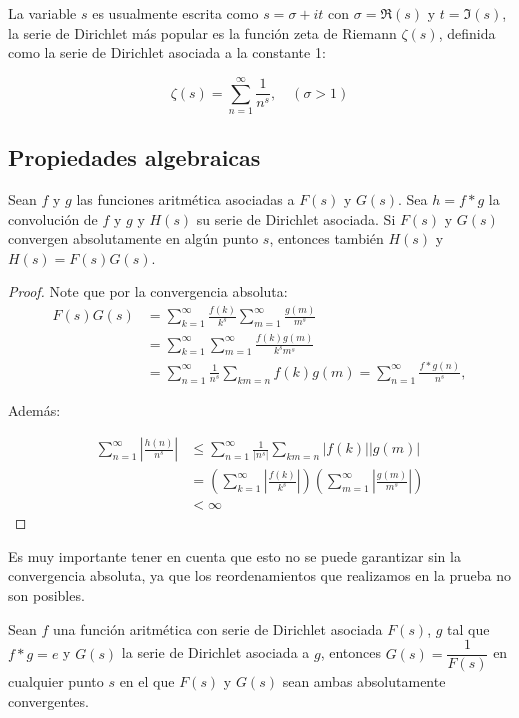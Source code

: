 La variable $s$ es usualmente escrita como $s=\sigma+it$ con $\sigma=\Re(s)$ y $t=\Im(s)$, la serie de Dirichlet más popular es la función zeta de Riemann $\zeta(s)$, definida como la serie de Dirichlet asociada a la constante 1:

$$\zeta(s)=\sum_{n=1}^{\infty} \frac{1}{n^s}, \quad (\sigma>1) $$

\subsection{Propiedades algebraicas}

\begin{theorem}\label{proddirich}
Sean $f$ y $g$ las funciones aritmética asociadas a $F(s)$ y $G(s)$. Sea $h=f*g$ la convolución de $f$ y $g$ y $H(s)$ su serie de Dirichlet asociada. Si $F(s)$ y $G(s)$ convergen absolutamente en algún punto $s$, entonces también $H(s)$ y $H(s)=F(s)G(s)$. 
\end{theorem}

\begin{proof}
Note que por la convergencia absoluta:
$$
\begin{aligned}
F(s) G(s) &=\sum_{k=1}^{\infty} \frac{f(k)}{k^s}\sum_{m=1}^{\infty} \frac{g(m)}{m^s} \\
&=\sum_{k=1}^{\infty} \sum_{m=1}^{\infty} \frac{f(k) g(m)}{k^s m^s} \\
& =\sum_{n=1}^{\infty} \frac{1}{n^s} \sum_{k m=n} f(k) g(m)=\sum_{n=1}^{\infty} \frac{f * g(n)}{n^s},
\end{aligned}
$$

Además:

$$
\begin{aligned}
\sum_{n=1}^{\infty}\left|\frac{h(n)}{n^s}\right| & \leq \sum_{n=1}^{\infty} \frac{1}{\left|n^s\right|} \sum_{k m=n}|f(k)||g(m)| \\
& =\left(\sum_{k=1}^{\infty}\left|\frac{f(k)}{k^s}\right|\right)\left(\sum_{m=1}^{\infty}\left|\frac{g(m)}{m^s}\right|\right)\\
&<\infty
\end{aligned}
$$
\end{proof}

Es muy importante tener en cuenta que esto no se puede garantizar sin la convergencia absoluta, ya que los reordenamientos que realizamos en la prueba no son posibles.

\begin{corollary}

Sean $f$ una función aritmética con serie de Dirichlet asociada $F(s)$, $g$ tal que $f*g=e$ y $G(s)$ la serie de Dirichlet asociada a $g$, entonces $G(s)=\dfrac{1}{F(s)}$ en cualquier punto $s$ en el que $F(s)$ y $G(s)$ sean ambas absolutamente convergentes.

\end{corollary}
\pagebreak

